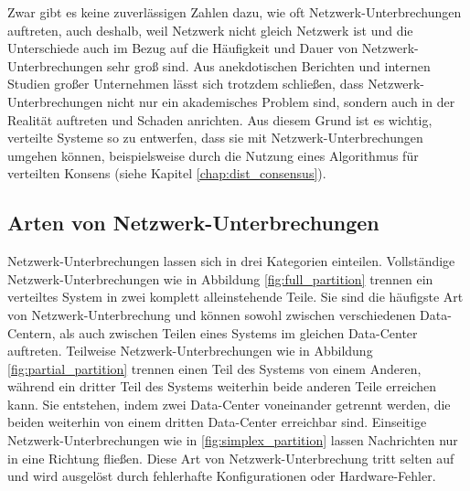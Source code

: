 \documentclass[12pt,a4paper]{report}
\begin{document}
Zwar gibt es keine zuverlässigen Zahlen dazu, wie oft Netzwerk-Unterbrechungen auftreten, auch deshalb, weil Netzwerk nicht gleich
Netzwerk ist und die Unterschiede auch im Bezug auf die Häufigkeit und Dauer von Netzwerk-Unterbrechungen sehr groß sind. Aus
anekdotischen Berichten und internen Studien großer Unternehmen lässt sich trotzdem schließen, dass Netzwerk-Unterbrechungen nicht
nur ein akademisches Problem sind, sondern auch in der Realität auftreten und Schaden anrichten. Aus diesem Grund ist es wichtig,
verteilte Systeme so zu entwerfen, dass sie mit Netzwerk-Unterbrechungen umgehen können, beispielsweise durch die Nutzung eines
Algorithmus für verteilten Konsens (siehe Kapitel \ref{chap:dist_consensus}). \cite{the_network_is_reliable}

\subsection{Arten von Netzwerk-Unterbrechungen}
Netzwerk-Unterbrechungen lassen sich in drei Kategorien einteilen. Vollständige Netzwerk-Unterbrechungen wie in Abbildung
\ref{fig:full_partition} trennen ein verteiltes System in zwei komplett alleinstehende Teile. Sie sind die häufigste Art von
Netzwerk-Unterbrechung und können sowohl zwischen verschiedenen Data-Centern, als auch zwischen Teilen eines Systems im gleichen
Data-Center auftreten. Teilweise Netzwerk-Unterbrechungen wie in Abbildung \ref{fig:partial_partition} trennen einen Teil des
Systems von einem Anderen, während ein dritter Teil des Systems weiterhin beide anderen Teile erreichen kann. Sie entstehen, indem
zwei Data-Center voneinander getrennt werden, die beiden weiterhin von einem dritten Data-Center erreichbar sind. Einseitige
Netzwerk-Unterbrechungen wie in \ref{fig:simplex_partition} lassen Nachrichten nur in eine Richtung fließen. Diese Art von
Netzwerk-Unterbrechung tritt selten auf und wird ausgelöst durch fehlerhafte Konfigurationen oder Hardware-Fehler.
\cite{analysis_of_network_partition_failures}
\end{document}
